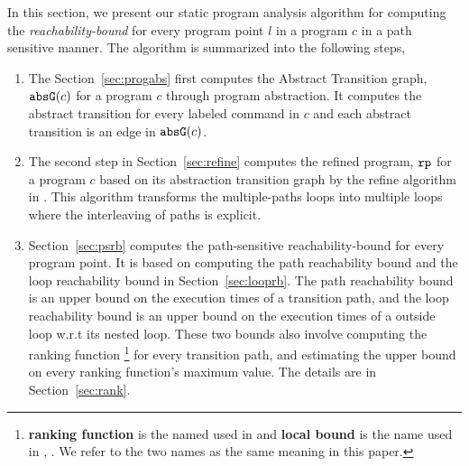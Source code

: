 In this section, we present our static program analysis algorithm for computing 
the \emph{reachability-bound} for every program point $l$ in a program $c$ in a path sensitive manner.
The algorithm is summarized into the following steps,
%
\begin{enumerate}
\item  The Section~\ref{sec:progabs} first 
computes the Abstract Transition graph, ${\mathtt{abs}}{{\mathtt{G}}}(c)$ for a program $c$ through program abstraction.
It computes the abstract transition 
for every labeled command in $c$ and each abstract transition is an edge in ${\mathtt{abs}}{{\mathtt{G}}}(c)$.
\item The second step in Section~\ref{sec:refine}
computes the refined program, ${\mathtt{rp}}$ for a program $c$ based on 
its abstraction transition graph by the refine algorithm in \cite{GulwaniJK09}.
This algorithm transforms the multiple-paths loops
into multiple loops where
the interleaving of paths is explicit.
\item Section~\ref{sec:psrb} computes the path-sensitive reachability-bound for every program point.
It is based on computing the path reachability bound and the loop reachability bound
in Section~\ref{sec:looprb}.
The path reachability bound is an upper bound on the execution times of a transition path,
and
the loop reachability bound is an upper bound on the execution times of a outside loop 
w.r.t its nested loop. These two bounds also involve computing the ranking function  
\footnote{\textbf{ranking function} is the named used in \cite{SinnZV14}
and \textbf{local bound} is the name used in \cite{ZulegerGSV11}, \cite{sinn2017complexity}.
We refer to the two names as the same meaning in this paper.} 
for every transition path,
and estimating the upper bound on every ranking function's maximum value. The details are in Section~\ref{sec:rank}.
\end{enumerate}